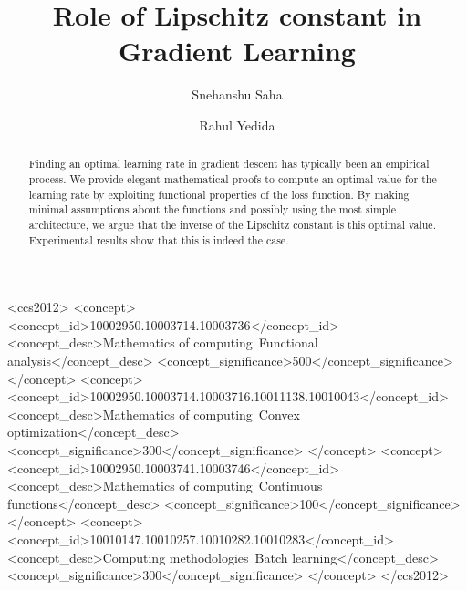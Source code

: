 \documentclass[sigconf,authordraft]{acmart}
\begin{document}
\title{Role of Lipschitz constant in Gradient Learning}

%
\author{Snehanshu Saha}

\author{Rahul Yedida}

%
\begin{abstract}
Finding an optimal learning rate in gradient descent has typically been an empirical process. We provide elegant mathematical proofs to compute an optimal value for the learning rate by exploiting functional properties of the loss function. By making minimal assumptions about the functions and possibly using the most simple architecture, we argue that the inverse of the Lipschitz constant is this optimal value. Experimental results show that this is indeed the case.
\end{abstract}

  \begin{CCSXML}
<ccs2012>
<concept>
<concept_id>10002950.10003714.10003736</concept_id>
<concept_desc>Mathematics of computing~Functional analysis</concept_desc>
<concept_significance>500</concept_significance>
</concept>
<concept>
<concept_id>10002950.10003714.10003716.10011138.10010043</concept_id>
<concept_desc>Mathematics of computing~Convex optimization</concept_desc>
<concept_significance>300</concept_significance>
</concept>
<concept>
<concept_id>10002950.10003741.10003746</concept_id>
<concept_desc>Mathematics of computing~Continuous functions</concept_desc>
<concept_significance>100</concept_significance>
</concept>
<concept>
<concept_id>10010147.10010257.10010282.10010283</concept_id>
<concept_desc>Computing methodologies~Batch learning</concept_desc>
<concept_significance>300</concept_significance>
</concept>
</ccs2012>
\end{CCSXML}

\end{document}
